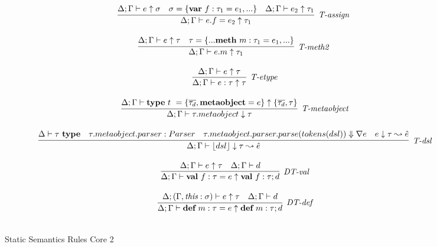 \begin{figure}
\[\begin{array}{c}
 

\infer[\textit{T-assign }]
	{\Delta; \Gamma \vdash  e.f=e_2 \uparrow \tau_1} 
	{\Delta; \Gamma \vdash e \uparrow \sigma & \sigma= \{\keyw{var}~ f:\tau_1=e_1,... \} & \Delta; \Gamma\vdash e_2 \uparrow\tau_1 }\\[3ex]

\infer[\textit{T-meth2 }]
	{\Delta; \Gamma \vdash  e.m \uparrow\tau_1} 
	{\Delta; \Gamma \vdash e \uparrow\tau & \tau=\{...\keyw{meth}~ m:\tau_1=e_1,... \} }\\[3ex]

\infer[\textit{T-etype}]
	{\Delta; \Gamma  \vdash  e:\tau \uparrow \tau }
	{\Delta; \Gamma \vdash e \uparrow \tau } \\[3ex]


\infer[\textit{T-metaobject}]
        {\Delta; \Gamma \vdash \tau.metaobject \downarrow \tau   }
	{\Delta; \Gamma \vdash  \keyw{type}~ t~=\{\overline{\tau_d}, \keyw{metaobject}=e\} \uparrow \{\overline{\tau_d},\tau\}} \\[3ex]

\infer[\textit{T-dsl}]
        {\Delta; \Gamma \vdash \lfloor dsl \rfloor \downarrow \tau \leadsto \hat{e} }
	{\Delta \vdash \tau\ \keyw{type}& \tau.metaobject.parser:Parser & \tau.metaobject.parser.parse(tokens(dsl)) \Downarrow \nabla e & e\downarrow \tau \leadsto \hat{e}} \\[3ex]


\infer[\textit{DT-val}]
	{\Delta; \Gamma \vdash \keyw{val}~ f:\tau = e \uparrow \keyw{val}~ f:\tau; d }
	{\Delta; \Gamma \vdash e \uparrow \tau & \Delta; \Gamma \vdash d} \\[3ex]
	
\infer[\textit{DT-def}]
	{\Delta; \Gamma \vdash \keyw{def}~ m:\tau = e \uparrow \keyw{def}~ m:\tau; d }
	{\Delta; (\Gamma, \textit{this}:\sigma) \vdash e  \uparrow \tau & \Delta; \Gamma \vdash d } \\[3ex]




\end{array}
\]
\caption{Static Semantics Rules Core 2}
\end{figure}
